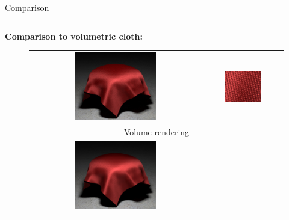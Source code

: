 \documentclass[final]{beamer}
\newlength{\onecolwid}
\newlength{\twocolwid}
\begin{document}
\begin{frame}[t]
\begin{columns}[t]
\begin{column}{\twocolwid}
\begin{block}{Comparison}
\begin{columns}[t,totalwidth=\twocolwid]
                \begin{column}{\onecolwid}
                    \textbf{Comparison to volumetric cloth:}
                    \begin{figure}
                        \vspace{-1cm}
                    	\begin{tabular}{cc}
                    		\includegraphics[width=0.49\textwidth]{results/gabardine_ref.jpg} &
                    		\includegraphics[width=0.49\textwidth]{results/gabardine_ref_inset_128spp.jpg} \\
                    		\multicolumn{2}{c}{\vspace{1cm} \small{Volume rendering}} \\
                    		\includegraphics[width=0.49\textwidth]{results/gabardine.jpg} &

\end{tabular}
\end{figure}
\end{column}
\end{columns}
\end{block}
\end{column}
\end{columns}
\end{frame}
\end{document}
